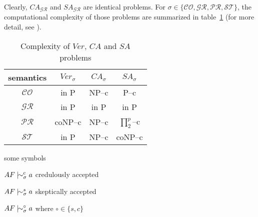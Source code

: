 Clearly, 
$CA_\mathcal{GR}$ and $SA_\mathcal{GR}$ are identical problems.
% 
For $\sigma \in \{\mathcal{CO,GR,PR,ST}\}$, 
the computational complexity of those problems are summarized in  table~\ref{tab: complexity} (for more detail, see \cite{Dun.Woo2009,Dvo.Dun2018}).


\begin{table}[th!]
    \centering
    \caption{Complexity of $Ver$, $CA$ and $SA$ problems}
    \label{tab: complexity}
    \renewcommand{\arraystretch}{1.5}
    \begin{tabular}{c||ccc}
    \hline

    semantics & $Ver_\sigma$ & $CA_\sigma$ & $SA_\sigma$   \\
    \hline

    $\mathcal{CO}$ & 
    in P & 
    NP--c & 
    P--c  \\

    $\mathcal{GR}$ & 
    in P & 
    in P & 
    in P  \\

    $\mathcal{PR}$ & 
    coNP--c & 
    NP--c & 
    $\prod^p_2$--c  \\

    $\mathcal{ST}$ & 
    in P & 
    NP--c & 
    coNP--c  \\
    
    \hline
\end{tabular}
\end{table}





\vspace*{3em}


\noindent\dotfill some symbols \noindent\dotfill


$AF \;|\hspace{-1ex}\sim^c_\sigma a$ credulously accepted

$AF \;|\hspace{-1ex}\sim^s_\sigma a$ skeptically accepted

$AF \;|\hspace{-1ex}\sim^\circ_\sigma a$  where $\circ \in \{s,c\}$




\newpage
{}
